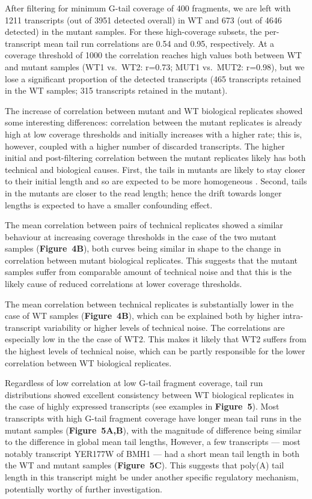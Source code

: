 \documentclass[10pt]{article}
\begin{document}
After filtering for minimum G-tail coverage of 400 fragments, we are left with 1211 transcripts (out of 3951 detected overall) in WT and 673 (out of 4646 detected) in the mutant samples. For these high-coverage subsets, the per-transcript mean tail run correlations are 0.54 and 0.95, respectively. At a coverage threshold of 1000 the correlation reaches high values both between WT and mutant samples (WT1 vs.\ WT2: r=0.73; MUT1 vs.\ MUT2: r=0.98), but we lose a significant proportion of the detected transcripts (465 transcripts retained in the WT samples; 315 transcripts retained in the mutant).

The increase of correlation between mutant and WT biological replicates showed some interesting differences: correlation between the mutant replicates is already high at low coverage thresholds and initially increases with a higher rate; this is, however, coupled with a higher number of discarded transcripts. The higher initial and post-filtering correlation between the mutant replicates likely has both technical and biological causes. First, the tails in mutants are likely to stay closer to their initial length and so are expected to be more homogeneous \cite{traven05,beilharz07}. Second, tails in the mutants are closer to the read length; hence the drift towards longer lengths is expected to have a smaller confounding effect.

The mean correlation between pairs of technical replicates showed a similar behaviour at increasing coverage thresholds in the case of the two mutant samples (\textbf{Figure~4B}), both curves being similar in shape to the change in correlation between mutant biological replicates. This suggests that the mutant samples suffer from comparable amount of technical noise and that this is the likely cause of reduced correlations at lower coverage thresholds.

The mean correlation between technical replicates is substantially lower in the case of WT samples (\textbf{Figure~4B}), which can be explained both by higher intra-transcript variability or higher levels of technical noise. The correlations are especially low in the the case of WT2. This makes it likely that WT2 suffers from the highest levels of technical noise, which can be partly responsible for the lower correlation between WT biological replicates.

Regardless of low correlation at low G-tail fragment coverage, tail run distributions showed excellent consistency between WT biological replicates in the case of highly expressed transcripts (see examples in \textbf{Figure~5}). Most transcripts with high G-tail fragment coverage have longer mean tail runs in the mutant samples (\textbf{Figure~5A,B}), with the magnitude of difference being similar to the difference in global mean tail lengths, However, a few transcripts --- most notably transcript YER177W of BMH1 --- had a short mean tail length in both the WT and mutant samples (\textbf{Figure~5C}). This suggests that poly(A) tail length in this transcript might be under another specific regulatory mechanism, potentially worthy of further investigation.
\end{document}

